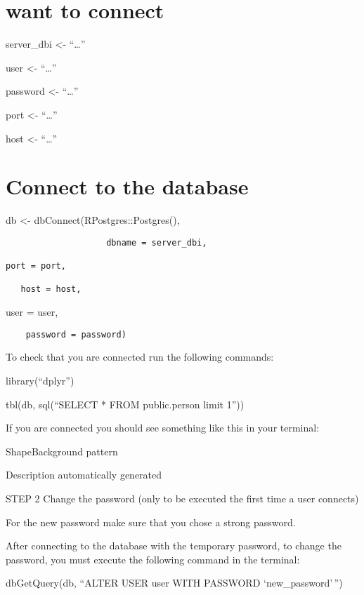 \documentclass[
  letterpaper,
  DIV=11,
  numbers=noendperiod]{scrreprt}
\begin{document}
\hypertarget{want-to-connect}{%
\section{want to connect}\label{want-to-connect}}

server\_dbi \textless- ``\ldots{}''

user \textless- ``\ldots{}''

password \textless- ``\ldots{}''

port \textless- ``\ldots{}''

host \textless- ``\ldots{}''

\hypertarget{connect-to-the-database-1}{%
\section{Connect to the database}\label{connect-to-the-database-1}}

db \textless- dbConnect(RPostgres::Postgres(),

\begin{verbatim}
                    dbname = server_dbi, 

port = port, 

   host = host, 
\end{verbatim}

user = user,

\begin{verbatim}
    password = password) 
\end{verbatim}

To check that you are connected run the following commands:

library(``dplyr'')

tbl(db, sql(``SELECT * FROM public.person limit 1''))

If you are connected you should see something like this in your
terminal:

ShapeBackground pattern

Description automatically generated

STEP 2 Change the password (only to be executed the first time a user
connects)

For the new password make sure that you chose a strong password.

After connecting to the database with the temporary password, to change
the password, you must execute the following command in the terminal:

dbGetQuery(db, ``ALTER USER user WITH PASSWORD `new\_password'\,'')
\end{document}
